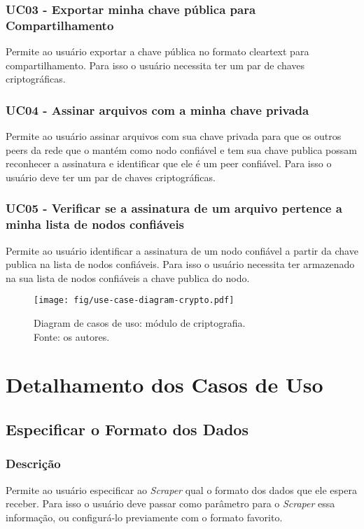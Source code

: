 \subsubsection{UC03 - Exportar minha chave pública para Compartilhamento}
Permite ao usuário exportar a chave pública no formato cleartext para compartilhamento. Para isso o usuário necessita ter um par de chaves criptográficas. 
\subsubsection{UC04 - Assinar arquivos com a minha chave privada}
Permite ao usuário assinar arquivos com sua chave privada para que os outros peers da rede que o mantém como nodo confiável e tem sua chave publica possam reconhecer a assinatura e identificar que ele é um peer confiável. Para isso o usuário deve ter um par de chaves criptográficas.
\subsubsection{UC05 - Verificar se a assinatura de um arquivo pertence a minha lista de nodos confiáveis}
Permite ao usuário identificar a assinatura de um nodo confiável a partir da chave publica na lista de nodos confiáveis. Para isso o usuário necessita ter armazenado na sua lista de nodos confiáveis a chave publica do nodo.

\begin{figure}[htb]
    \centering
    \texttt{[image: fig/use-case-diagram-crypto.pdf]}
    \caption[Use case diagram: cryptography module]{
        Diagram de casos de uso: módulo de criptografia.\\
        Fonte: os autores.
    }
\end{figure}

\section{Detalhamento dos Casos de Uso}

\subsection{Especificar o Formato dos Dados}

\subsubsection{Descrição}
Permite ao usuário especificar ao \textit{Scraper} qual o formato dos dados que ele espera receber. Para isso o usuário deve passar como parâmetro para o \textit{Scraper} essa informação, ou configurá-lo previamente com o formato favorito.

